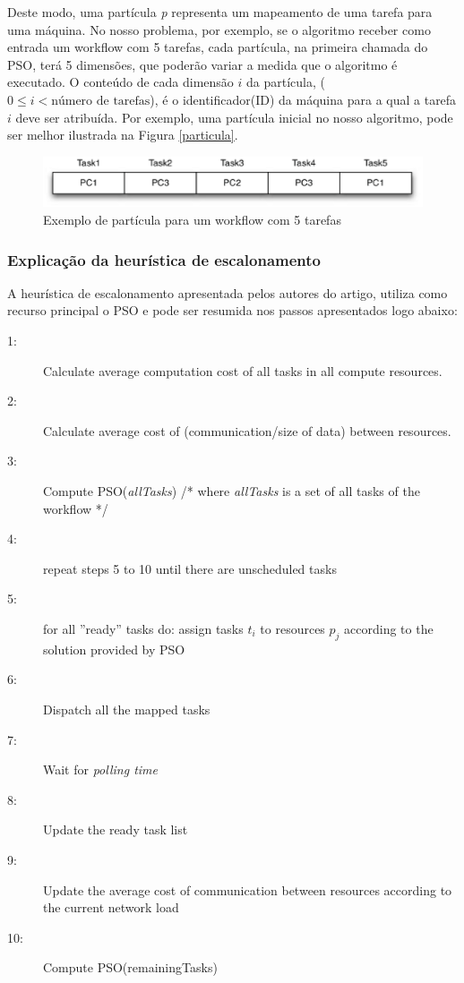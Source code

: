 \documentclass[a4paper,10pt]{article}
\begin{document}
Deste modo, uma partícula \emph{p} representa um mapeamento de uma tarefa para uma máquina. No nosso problema, por exemplo, se o 
algoritmo receber como entrada um workflow com 5 tarefas, cada partícula, na primeira chamada do PSO, terá 5 dimensões, que poderão variar 
a medida que o algoritmo é executado. O conteúdo de cada dimensão $i$ da partícula, ($0 \leq i < \text{número de tarefas}$), 
é o identificador(ID) da máquina para a qual a tarefa $i$ deve ser atribuída. Por exemplo, uma partícula inicial no nosso algoritmo, 
pode ser melhor ilustrada na Figura \eqref{particula}.\\

\begin{figure}[!htb]
\centering
\includegraphics[scale=.5]{figures/fig1.eps}
\caption{Exemplo de partícula para um workflow com 5 tarefas}
\label{particula}
\end{figure}

\subsubsection{Explicação da heurística de escalonamento}

A heurística de escalonamento apresentada pelos autores do artigo, utiliza como recurso principal o PSO e pode ser resumida nos passos
apresentados logo abaixo:\\

\begin{description}
\item[1:] Calculate average computation cost of all tasks in all compute resources.
\item[2:] Calculate average cost of (communication/size of data) between resources.
\item[3:] Compute PSO(\emph{allTasks}) /* where \emph{allTasks} is a set of all tasks of the workflow */
\item[4:] repeat steps 5 to 10 until there are unscheduled tasks
\item[5:] for all ''ready'' tasks do: assign tasks $t_{i}$ to resources $p_{j}$ according to the solution provided by PSO
\item[6:] Dispatch all the mapped tasks
\item[7:] Wait for \emph{polling time}
\item[8:] Update the ready task list
\item[9:] Update the average cost of communication between resources according to the current network load
\item[10:] Compute PSO(remainingTasks)
\end{description}
\end{document}
